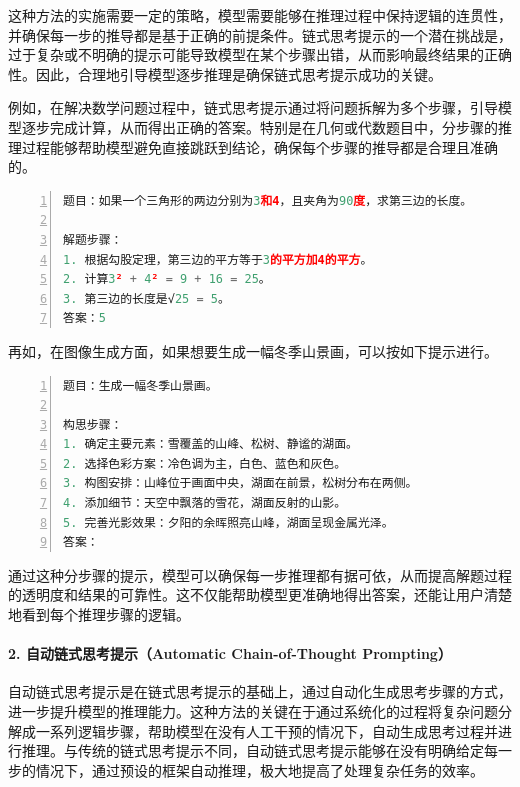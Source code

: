 这种方法的实施需要一定的策略，模型需要能够在推理过程中保持逻辑的连贯性，并确保每一步的推导都是基于正确的前提条件。链式思考提示的一个潜在挑战是，过于复杂或不明确的提示可能导致模型在某个步骤出错，从而影响最终结果的正确性。因此，合理地引导模型逐步推理是确保链式思考提示成功的关键。

例如，在解决数学问题过程中，链式思考提示通过将问题拆解为多个步骤，引导模型逐步完成计算，从而得出正确的答案。特别是在几何或代数题目中，分步骤的推理过程能够帮助模型避免直接跳跃到结论，确保每个步骤的推导都是合理且准确的。

\begin{lstlisting}[language={python},label={},caption={}, basicstyle=\footnotesize\ttfamily, breaklines=true, numbers=left, frame=single]
题目：如果一个三角形的两边分别为3和4，且夹角为90度，求第三边的长度。

解题步骤：
1. 根据勾股定理，第三边的平方等于3的平方加4的平方。
2. 计算3² + 4² = 9 + 16 = 25。
3. 第三边的长度是√25 = 5。
答案：5
\end{lstlisting}

再如，在图像生成方面，如果想要生成一幅冬季山景画，可以按如下提示进行。

\begin{lstlisting}[language={python},label={},caption={}, basicstyle=\footnotesize\ttfamily, breaklines=true, numbers=left, frame=single]
题目：生成一幅冬季山景画。

构思步骤：
1. 确定主要元素：雪覆盖的山峰、松树、静谧的湖面。
2. 选择色彩方案：冷色调为主，白色、蓝色和灰色。
3. 构图安排：山峰位于画面中央，湖面在前景，松树分布在两侧。
4. 添加细节：天空中飘落的雪花，湖面反射的山影。
5. 完善光影效果：夕阳的余晖照亮山峰，湖面呈现金属光泽。
答案：
\end{lstlisting}

通过这种分步骤的提示，模型可以确保每一步推理都有据可依，从而提高解题过程的透明度和结果的可靠性。这不仅能帮助模型更准确地得出答案，还能让用户清楚地看到每个推理步骤的逻辑。

\paragraph{2. 自动链式思考提示（Automatic Chain-of-Thought Prompting）} 

自动链式思考提示是在链式思考提示的基础上，通过自动化生成思考步骤的方式，进一步提升模型的推理能力。这种方法的关键在于通过系统化的过程将复杂问题分解成一系列逻辑步骤，帮助模型在没有人工干预的情况下，自动生成思考过程并进行推理。与传统的链式思考提示不同，自动链式思考提示能够在没有明确给定每一步的情况下，通过预设的框架自动推理，极大地提高了处理复杂任务的效率。

